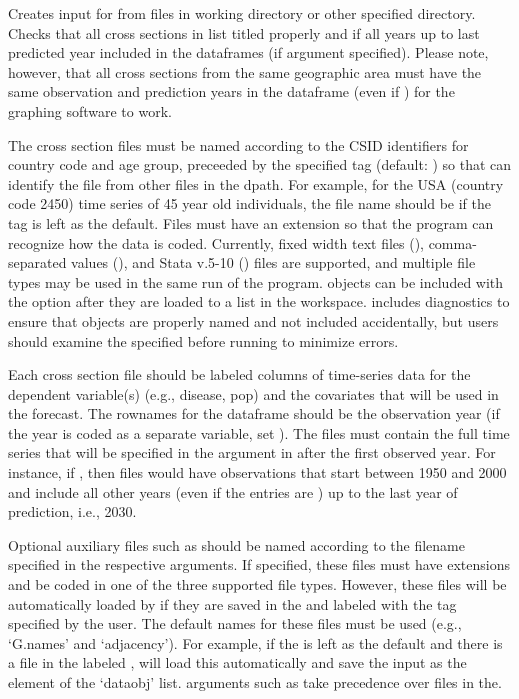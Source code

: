 \begin{Details}\relax
Creates  input for  from
files in working directory or other specified directory. Checks
that all cross sections in  list titled properly and
if all years up to last predicted year included in the dataframes
(if  argument specified). Please note, however,
that all cross sections from the same geographic area must have the
same observation and prediction years in the dataframe (even if
) for the graphing software  to
work.

The cross section files must be named according to the CSID
identifiers for country code and age group, preceeded by the
specified tag (default: ) so that  can
identify the file from other files in the dpath. For example, for
the USA (country code 2450) time series of 45 year old
individuals, the file name should be  if the
tag is left as the default. Files must have an extension so that
the program can recognize how the data is coded. Currently, fixed
width text files (), comma-separated values
(), and Stata v.5-10 () files are
supported, and multiple file types may be used in the same run of
the program.  objects can be included with the
 option after they are loaded to a list in the
workspace.  includes diagnostics to ensure that
objects are properly named and not included accidentally, but
users should examine the specified  before running
 to minimize errors.

Each cross section file should be labeled columns of time-series
data for the dependent variable(s) (e.g., disease, pop) and the
covariates that will be used in the forecast. The rownames for
the dataframe should be the observation year (if the year is
coded as a separate variable, set ). The
files must contain the full time series that will be specified in
the  argument in  after
the first observed year. For instance, if
, then files would have
observations that start between 1950 and 2000 and include all
other years (even if the entries are ) up to the last
year of prediction, i.e., 2030.

Optional auxiliary files such as  should be named
according to the filename specified in the respective
arguments. If specified, these files must have extensions and be
coded in one of the three supported file types. However, these
files will be automatically loaded by  if they are
saved in the  and labeled with the tag specified by the
user. The default names for these files must be used (e.g.,
`G.names' and `adjacency'). For example,
if the  is left as the default and there is a file in the
 labeled , 
will load this
automatically and save the input as the  element of
the `dataobj' list.  arguments such as
 take precedence over  files in
the.


\end{Details}

